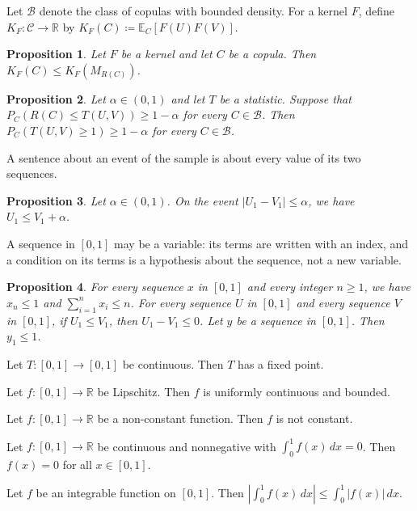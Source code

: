 \documentclass{article}
\newtheorem{proposition}{Proposition}
\newcommand{\CC}{\mathcal{C}}
\begin{document}
Let $\mathcal B$ denote the class of copulas with bounded density.
For a kernel $F$, define $K_F:\CC\to\mathbb{R}$ by $K_F(C)\coloneqq\mathbb{E}_C[F(U)F(V)]$.

\begin{proposition}\label{p25}
Let $F$ be a kernel and let $C$ be a copula.
Then $K_F(C)\le K_F(M_{R(C)})$.
\end{proposition}

\begin{proposition}\label{p26}
Let $\alpha\in(0,1)$ and let $T$ be a statistic.
Suppose that $P_C(R(C)\le T(U,V))\ge1-\alpha$ for every $C\in\mathcal B$.
Then $P_C(T(U,V)\ge1)\ge1-\alpha$ for every $C\in\mathcal B$.
\end{proposition}

A sentence about an event of the sample is about every value of its two sequences.

\begin{proposition}\label{p27}
Let $\alpha\in(0,1)$.
On the event $|U_1-V_1|\le\alpha$, we have $U_1\le V_1+\alpha$.
\end{proposition}

A sequence in $[0,1]$ may be a variable: its terms are written with an index, and a
condition on its terms is a hypothesis about the sequence, not a new variable.

\begin{proposition}\label{p28}
For every sequence $x$ in $[0,1]$ and every integer $n\ge1$, we have $x_n\le1$ and $\sum_{i=1}^{n}x_i\le n$.
For every sequence $U$ in $[0,1]$ and every sequence $V$ in $[0,1]$, if $U_1\le V_1$, then $U_1-V_1\le0$.
Let $y$ be a sequence in $[0,1]$.
Then $y_1\le1$.
\end{proposition}
\begin{lemma}\label{interval-fixed-point}
Let $T\colon[0,1]\to[0,1]$ be continuous. Then $T$ has a fixed point.
\end{lemma}

\begin{lemma}\label{interval-adjectives}
Let $f\colon[0,1]\to\mathbb{R}$ be Lipschitz. Then $f$ is uniformly continuous and bounded.
\end{lemma}

\begin{lemma}\label{interval-nonconstant}
Let $f\colon[0,1]\to\mathbb{R}$ be a non-constant function. Then $f$ is not constant.
\end{lemma}

\begin{lemma}\label{continuous-nonnegative}
Let $f\colon[0,1]\to\mathbb{R}$ be continuous and nonnegative with $\int_0^1f(x)\,dx=0$. Then $f(x)=0$ for all $x\in[0,1]$.
\end{lemma}

\begin{lemma}\label{integrable-on-interval}
Let $f$ be an integrable function on $[0,1]$. Then $|\int_0^1f(x)\,dx|\le\int_0^1|f(x)|\,dx$.
\end{lemma}
\end{document}
